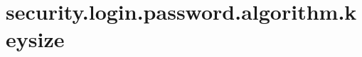 \section{security.login.password.algorithm.keysize}
\label{configuration:SecurityLoginPasswordAlgorithmKeysize}
\AvailableInJavaOnly{\TODO}